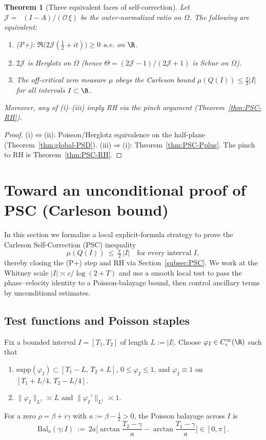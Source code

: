 \documentclass[11pt]{article}
\newtheorem{theorem}{Theorem}
\theoremstyle{remark}
\DeclareMathOperator{\dettwo}{det_2}
\begin{document}
\begin{theorem}[Three equivalent faces of self-correction]\label{thm:SC-equivalences}
Let $\mathcal J=\dettwo(I-A)/(\mathcal O\,\xi)$ be the outer-normalized ratio on $\Omega$. The following are equivalent:
\begin{enumerate}
\item[\textup{(i)}] \textup{(P+)}: $\Re\bigl(2\mathcal J(\tfrac12+it)\bigr)\ge 0$ a.e. on $\R$.
\item[\textup{(ii)}] $2\mathcal J$ is Herglotz on $\Omega$ (hence $\Theta=(2\mathcal J-1)/(2\mathcal J+1)$ is Schur on $\Omega$).
\item[\textup{(iii)}] The off-critical zero measure $\mu$ obeys the Carleson bound $\mu(Q(I))\le \tfrac{\pi}{2}|I|$ for all intervals $I\subset\R$.
\end{enumerate}
Moreover, any of (i)–(iii) imply RH via the pinch argument (Theorem~\ref{thm:PSC-RH}).
\end{theorem}
\begin{proof}
(i)$\Leftrightarrow$(ii): Poisson/Herglotz equivalence on the half-plane (Theorem~\ref{thm:global-PSD}). (iii)$\Rightarrow$(i): Theorem~\ref{thm:PSC-Pplus}. The pinch to RH is Theorem~\ref{thm:PSC-RH}.
\end{proof}


\section{Toward an unconditional proof of PSC (Carleson bound)}\label{sec:unconditional-psc-proof}
In this section we formalize a local explicit-formula strategy to prove the Carleson Self-Correction (PSC) inequality
\[ \mu(Q(I))\ \le\ \tfrac{\pi}{2}\,|I| \quad\text{for every interval } I, \]
thereby closing the (P+) step and RH via Section~\ref{subsec:PSC}. We work at the Whitney scale \(|I|\asymp c/\log(2+T)\) and use a smooth local test to pass the phase--velocity identity to a Poisson-balayage bound, then control ancillary terms by unconditional estimates.

\subsection{Test functions and Poisson staples}
Fix a bounded interval \(I=[T_1,T_2]\) of length \(L:=|I|\). Choose \(\varphi_I\in C_c^\infty(\R)\) such that
\begin{enumerate}
\item[(i)] \(\mathrm{supp}(\varphi_I)\subset [T_1-L,\,T_2+L]\), \(0\le\varphi_I\le 1\), and \(\varphi_I\equiv 1\) on \([T_1+L/4,\,T_2-L/4]\).
\item[(ii)] \(\|\varphi_I\|_{L^1}\asymp L\) and \(\|\varphi_I'\|_{L^1}\asymp 1\).
\end{enumerate}
For a zero \(\rho=\beta+i\gamma\) with \(a:=\beta-\tfrac12>0\), the Poisson balayage across \(I\) is
\[ \mathrm{Bal}_a(\gamma;I)\ :=\ 2a\Big[\arctan\!\frac{T_2-\gamma}{a}-\arctan\!\frac{T_1-\gamma}{a}\Big]\in[0,\pi].\]
\end{document}
